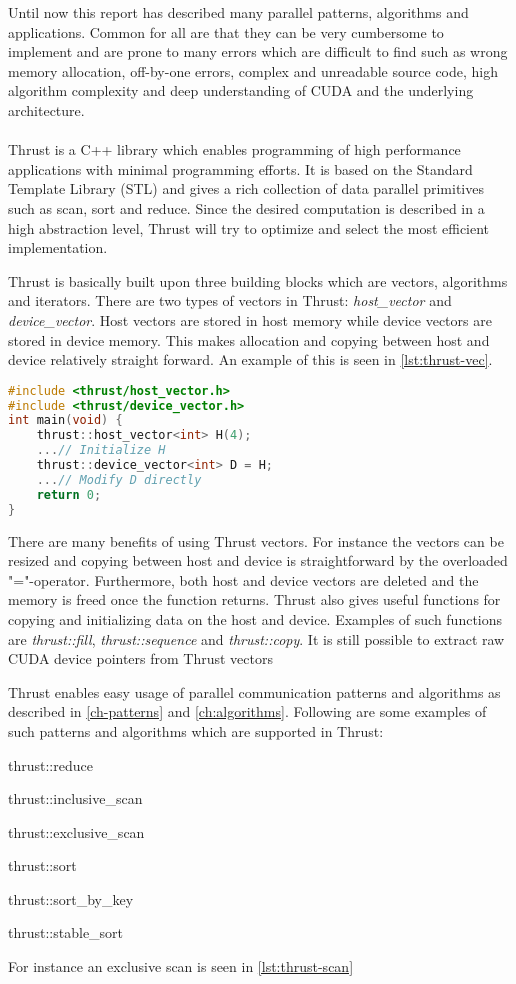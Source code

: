 Until now this report has described many parallel patterns, algorithms and applications.
Common for all are that they can be very cumbersome to implement and are prone to many  errors which are difficult to find such as wrong memory allocation, off-by-one errors, complex and unreadable source code, high algorithm complexity and deep understanding of CUDA and the underlying architecture.
\\\\
Thrust is a C++ library which enables programming of high performance applications with minimal programming efforts.
It is based on the Standard Template Library (STL) and gives a rich collection of data parallel primitives such as scan, sort and reduce.
Since the desired computation is described in a high abstraction level, Thrust will try to optimize and select the most efficient implementation.

Thrust is basically built upon three building blocks which are vectors, algorithms and iterators.
There are two types of vectors in Thrust: \textit{host\_vector} and \textit{device\_vector}.
Host vectors are stored in host memory while device vectors are stored in device memory.
This makes allocation and copying between host and device relatively straight forward.
An example of this is seen in \autoref{lst:thrust-vec}.
\begin{lstlisting}[language=C,caption={Vectors in Thrust},label=lst:thrust-vec]
#include <thrust/host_vector.h> 
#include <thrust/device_vector.h> 
int main(void) { 
	thrust::host_vector<int> H(4); 
	...// Initialize H
	thrust::device_vector<int> D = H; 
	...// Modify D directly
	return 0;
}
\end{lstlisting}
There are many benefits of using Thrust vectors.
For instance the vectors can be resized and copying between host and device is straightforward by the overloaded "="-operator.
Furthermore, both host and device vectors are deleted and the memory is freed once the function returns.
Thrust also gives useful functions for copying and initializing data on the host and device.
Examples of such functions are \textit{thrust::fill}, \textit{thrust::sequence} and \textit{thrust::copy}.
It is still possible to extract raw CUDA device pointers from Thrust vectors

Thrust enables easy usage of parallel communication patterns and algorithms as described in \autoref{ch-patterns} and \autoref{ch:algorithms}.
Following are some examples of such patterns and algorithms which are supported in Thrust:
\begin{itemizeSmall}
	\item thrust::reduce
	\item thrust::inclusive\_scan
	\item thrust::exclusive\_scan
	\item thrust::sort
	\item thrust::sort\_by\_key
	\item thrust::stable\_sort
\end{itemizeSmall}
For instance an exclusive scan is seen in \autoref{lst:thrust-scan}

